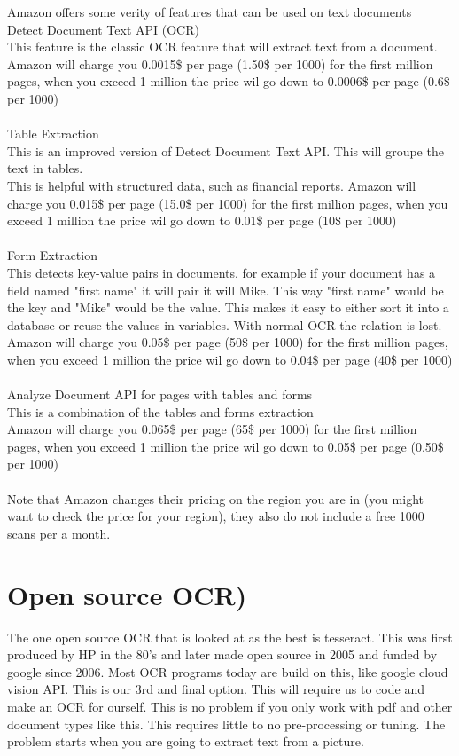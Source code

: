 Amazon offers some verity of features that can be used on text documents
\\
Detect Document Text API (OCR)\\
This feature is the classic OCR feature that will extract text from a document.\\
Amazon will charge you 0.0015\$ per page (1.50\$ per 1000) for the first million pages, when you exceed 1 million the price wil go down to
0.0006\$ per page (0.6\$ per 1000)
\\\\
Table Extraction\\
This is an improved version of Detect Document Text API. This will groupe the text in tables.\\
This is helpful with structured data, such as financial reports.
Amazon will charge you 0.015\$ per page (15.0\$ per 1000) for the first million pages, when you exceed 1 million the price wil go down to
0.01\$ per page (10\$ per 1000)
\\\\
Form Extraction\\
This detects key-value pairs in documents, for example if your document has a field named "first name" it will pair it will Mike.
This way "first name" would be the key and "Mike" would be the value.
This makes it easy to either sort it into a database or reuse the values in variables.
With normal OCR the relation is lost.\\
Amazon will charge you 0.05\$ per page (50\$ per 1000) for the first million pages, when you exceed 1 million the price wil go down to
0.04\$ per page (40\$ per 1000)
\\\\
Analyze Document API for pages with tables and forms\\
This is a combination of the tables and forms extraction\\
Amazon will charge you 0.065\$ per page (65\$ per 1000) for the first million pages, when you exceed 1 million the price wil go down to
0.05\$ per page (0.50\$ per 1000)
\\\\
Note that Amazon changes their pricing on the region you are in (you might want to check the price for your region), they also do not include a free 1000 scans per a month.

\section{Open source OCR)}\label{sec:Open source)}
The one open source OCR that is looked at as the best is tesseract.
This was first produced by HP in the 80's and later made open source in 2005 and funded by google since 2006.
Most OCR programs today are build on this, like google cloud vision API. This is our 3rd and final option.
This will require us to code and make an OCR for ourself.
This is no problem if you only work with pdf and other document types like this.
This requires little to no pre-processing or tuning.
The problem starts when you are going to extract text from a picture.

